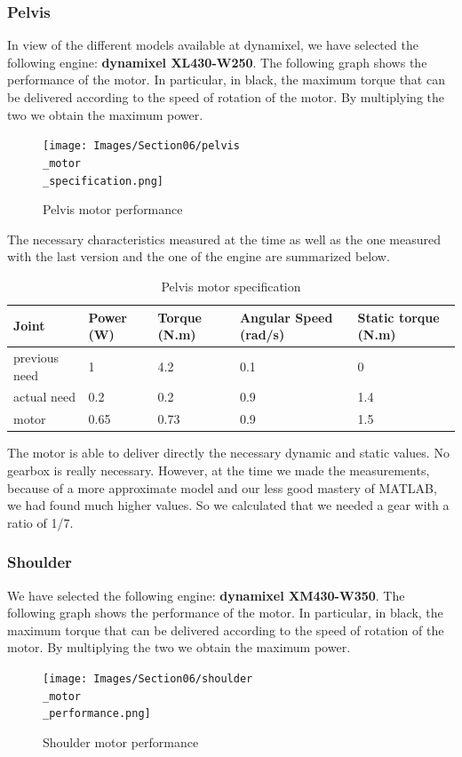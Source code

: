 \subsubsection{Pelvis}

In view of the different models available at dynamixel, we have selected the following engine: \textbf{dynamixel XL430-W250}. The following graph shows the performance of the motor. In particular, in black, the maximum torque that can be delivered according to the speed of rotation of the motor. By multiplying the two we obtain the maximum power.
\begin{figure}[ht]
    \centering
    \texttt{[image: Images/Section06/pelvis\\\_motor\\\_specification.png]}
    \caption{Pelvis motor performance}
    \label{fig:PelvisMotor}
\end{figure}
\FloatBarrier

\bigbreak
The necessary characteristics measured at the time as well as the one measured with the last version and the one of the engine are summarized below.
\begin{table}[ht]
    \centering
    \begin{tabular}{|p{1.5cm} | p{2cm} | p{2.5cm}| p{2.7cm} | p{2.7cm} |} 
        \hline
        \textbf{Joint}& \textbf{Power (W)} & \textbf{Torque (N.m)} & \textbf{Angular Speed (rad/s)} & \textbf{Static torque (N.m)}\\ [0.3ex]
        \hline
        previous need & 1 & 4.2 & 0.1 & 0 \\ 
        \hline
        actual need & 0.2 & 0.2 & 0.9 & 1.4 \\ 
        \hline
        motor & 0.65 & 0.73 & 0.9 & 1.5\\ 
        \hline
    \end{tabular}
    \caption{Pelvis motor specification}
\end{table}
\FloatBarrier
The motor is able to deliver directly the necessary dynamic and static values. No gearbox is really necessary. However, at the time we made the measurements, because of a more approximate model and our less good mastery of MATLAB, we had found much higher values. So we calculated that we needed a gear with a ratio of 1/7.

\subsubsection{Shoulder}

 We have selected the following engine: \textbf{dynamixel XM430-W350}. The following graph shows the performance of the motor. In particular, in black, the maximum torque that can be delivered according to the speed of rotation of the motor. By multiplying the two we obtain the maximum power.
\begin{figure}[ht]
    \centering
    \texttt{[image: Images/Section06/shoulder\\\_motor\\\_performance.png]}
    \caption{Shoulder motor performance}
    \label{fig:ShoulderMotor}
\end{figure}
\FloatBarrier


